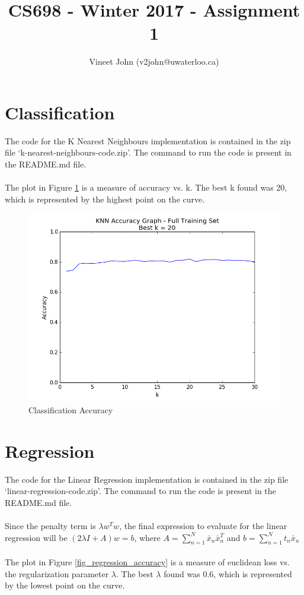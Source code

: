 \documentclass[a4paper]{article}
\title{CS698 - Winter 2017 - Assignment 1}
\author{Vineet John (v2john@uwaterloo.ca)}
\date{}
\begin{document}
\maketitle

\renewcommand\thesubsection{\alph{subsection}}

\section{Classification}

The code for the K Nearest Neighbours implementation is contained in the zip file `k-nearest-neighbours-code.zip'. The command to run the code is present in the README.md file.
\\\\
The plot in Figure \ref{fig_classification_accuracy} is a measure of accuracy vs. k. The best k found was 20, which is represented by the highest point on the curve.

\begin{figure}[h]
    \centering
    \includegraphics[width=\textwidth]{images/knn_accuracy_crossval.png}
    \caption{Classification Accuracy}
    \label{fig_classification_accuracy}
\end{figure}

\newpage

\section{Regression}

The code for the Linear Regression implementation is contained in the zip file `linear-regression-code.zip'. The command to run the code is present in the README.md file.
\\\\
Since the penalty term is $\lambda w^Tw$, the final expression to evaluate for the linear regression will be $(2\lambda I + A)w = b$, where $A = \sum_{n=1}^N \bar{x}_n \bar{x}_n^T$ and $b = \sum_{n=1}^N t_n \bar{x}_n$
\\\\
The plot in Figure \ref{fig_regression_accuracy} is a measure of euclidean loss vs. the regularization parameter $\lambda$. The best $\lambda$ found was 0.6, which is represented by the lowest point on the curve.
\end{document}
